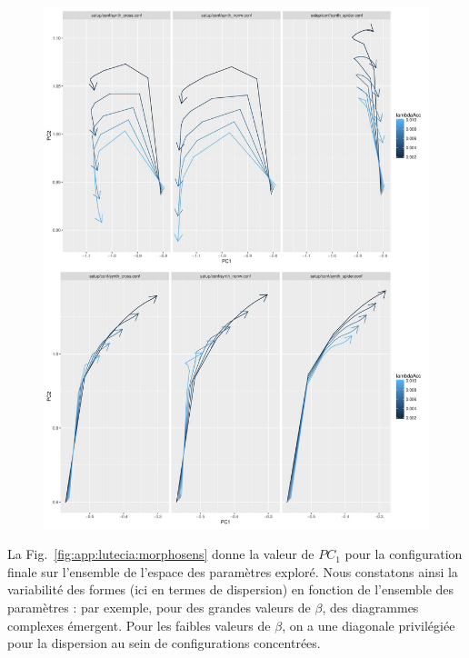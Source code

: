 \begin{figure}
	\includegraphics[width=\linewidth,height=0.9\textheight]{Figures/Final/A-lutecia-morphotrajs.jpg}
\end{figure}


La Fig.~\ref{fig:app:lutecia:morphosens} donne la valeur de $PC_1$ pour la configuration finale sur l'ensemble de l'espace des paramètres exploré. Nous constatons ainsi la variabilité des formes (ici en termes de dispersion) en fonction de l'ensemble des paramètres : par exemple, pour des grandes valeurs de $\beta$, des diagrammes complexes émergent. Pour les faibles valeurs de $\beta$, on a une diagonale privilégiée pour la dispersion au sein de configurations concentrées.


